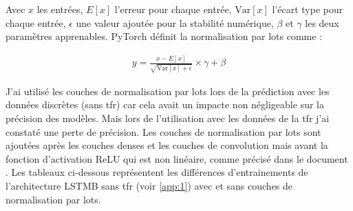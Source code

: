 Avec $x$ les entrées, $E[x]$ l'erreur pour chaque entrée, $\text{Var}[x]$ l'écart type pour chaque entrée, $\epsilon$ une valeur ajoutée pour la stabilité numérique, $\beta$ et $\gamma$ les deux paramètres apprenables. PyTorch \parencite{noauthor_batchnorm1d_nodate} définit la normalisation par lots comme :

{\Large
	\setlength{\abovedisplayskip}{-0.5cm}
	\begin{align*}
		y = \frac{x - E[x]}{\sqrt{\text{Var}[x] + \epsilon}}\times\gamma+\beta
	\end{align*}
}

J'ai utilisé les couches de normalisation par lots lors de la prédiction avec les données discrètes (sans \gls{tfr}) car cela avait un impacte non négligeable sur la précision des modèles. Mais lors de l'utilisation avec les données de la \gls{tfr} j'ai constaté une perte de précision. Les couches de normalisation par lots sont ajoutées après les couches denses et les couches de convolution mais avant la fonction d'activation ReLU qui est non linéaire, comme précisé dans le document \parencite{ioffe_batch_2015}. Les tableaux ci-dessous représentent les différences d'entrainements de l'architecture LSTMB sans \gls{tfr} (voir \autoref{app:1}) avec et sans couches de normalisation par lots.

\begin{table}[H]
\end{table}

